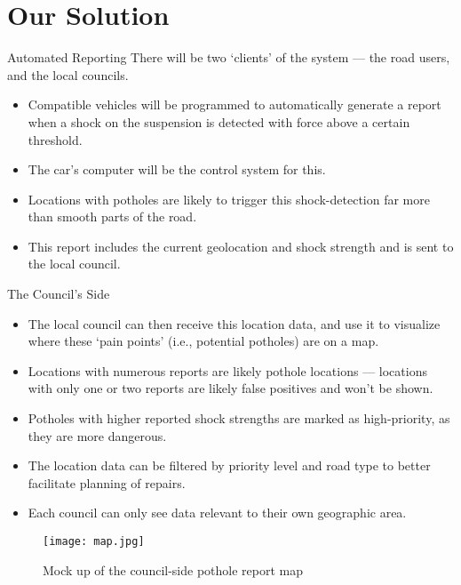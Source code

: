 \documentclass{beamer}
\begin{document}
\section{Our Solution}

\begin{frame}{Automated Reporting}
    There will be two `clients' of the system --- the road users, and the local councils.

    \begin{itemize}
        \item Compatible vehicles will be programmed to automatically generate a report when a shock on the suspension is detected with force above a certain threshold.
        \item The car's computer will be the control system for this.
        \item Locations with potholes are likely to trigger this shock-detection far more than smooth parts of the road.
        \item This report includes the current geolocation and shock strength and is sent to the local council.
    \end{itemize}
\end{frame}

\begin{frame}{The Council's Side}
    \begin{itemize}
        \item The local council can then receive this location data, and use it to visualize where these `pain points' (i.e., potential potholes) are on a map.
        \item Locations with numerous reports are likely pothole locations --- locations with only one or two reports are likely false positives and won't be shown.
        \item Potholes with higher reported shock strengths are marked as high-priority, as they are more dangerous.
        \item The location data can be filtered by priority level and road type to better facilitate planning of repairs.
        \item Each council can only see data relevant to their own geographic area.
    \end{itemize}    
\end{frame}

\begin{frame}
    \begin{figure}
        \texttt{[image: map.jpg]}
        \caption{Mock up of the council-side pothole report map}
    \end{figure}    
\end{frame}
\end{document}
